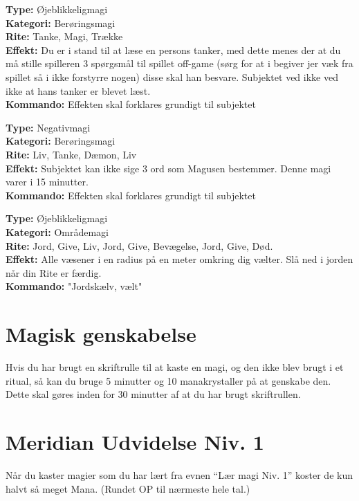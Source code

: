 \begin{lærmagi*}
\textbf{Type:} Øjeblikkeligmagi\\
\textbf{Kategori:} Berøringsmagi\\
\textbf{Rite:} Tanke, Magi, Trække\\
\textbf{Effekt:} Du er i stand til at læse en persons tanker, med dette menes der at du må stille spilleren 3 spørgsmål til spillet off-game (sørg for at i begiver jer væk fra spillet så i ikke forstyrre nogen) disse skal han besvare. Subjektet ved ikke ved ikke at hans tanker er blevet læst.\\
\textbf{Kommando:} Effekten skal forklares grundigt til subjektet\\
\end{lærmagi*}

\begin{lærmagi*}
\textbf{Type:} Negativmagi\\
\textbf{Kategori:} Berøringsmagi\\
\textbf{Rite:} Liv, Tanke, Dæmon, Liv\\
\textbf{Effekt:} Subjektet kan ikke sige 3 ord som Magusen bestemmer. Denne magi varer i 15 minutter.\\
\textbf{Kommando:} Effekten skal forklares grundigt til subjektet\\
\end{lærmagi*}

\begin{lærmagi*}[Jordskælv]
\textbf{Type:} Øjeblikkeligmagi\\
\textbf{Kategori:} Områdemagi\\
\textbf{Rite:} Jord, Give, Liv, Jord, Give, Bevægelse, Jord, Give, Død.\\
\textbf{Effekt:} Alle væsener i en radius på en meter omkring dig vælter. Slå ned i jorden når din Rite er færdig.\\
\textbf{Kommando:} "Jordskælv, vælt"\\
\end{lærmagi*}

\section{Magisk genskabelse}
Hvis du har brugt en skriftrulle til at kaste en magi, og den ikke blev brugt i et ritual, så kan du bruge 5 minutter og 10 manakrystaller på at genskabe den. Dette skal gøres inden for 30 minutter af at du har brugt skriftrullen.

\section{Meridian Udvidelse Niv. 1}
Når du kaster magier som du har lært fra evnen “Lær magi Niv. 1” koster de kun halvt så meget Mana. (Rundet OP til nærmeste hele tal.)